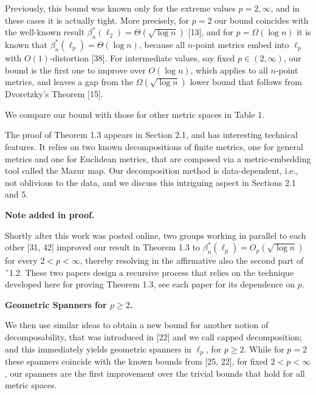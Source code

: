 \documentclass[10pt,a4paper]{amsart}
\begin{document}
\par
\par
Previously, this bound was known only for the extreme values $p=2,\infty$, and in these cases it is actually tight. More precisely, for $p=2$ our bound coincides with the well-known result $\beta^{*}_{n}(\ell_{2})=\Theta(\sqrt{\log{n}})$ [13], and for $p=\Omega(\log{n})$ it is known that $\beta^{*}_{n}(\ell_{p})=\Theta(\log{n})$, because all $n$-point metrics embed into $\ell_{p}$ with $O(1)$-distortion [38]. For intermediate values, say fixed $p\in(2,\infty)$, our bound is the first one to improve over $O(\log n)$, which applies to all $n$-point metrics, and leaves a gap from the $\Omega(\sqrt{\log{n}})$ lower bound that follows from Dvoretzky’s Theorem [15].
\par
\par
We compare our bound with those for other metric spaces in Table 1.
\par
\par
The proof of Theorem 1.3 appears in Section 2.1, and has interesting technical features. It relies on two known decompositions of finite metrics, one for general metrics and one for Euclidean metrics, that are composed via a metric-embedding tool called the Mazur map. Our decomposition method is data-dependent, i.e., not oblivious to the data, and we discuss this intriguing aspect in Sections 2.1 and 5.
\par
\par
\par\medskip\noindent\textbf{Note added in proof.}\par
Shortly after this work was posted online, two groups working in parallel to each other [31, 42] improved our result in Theorem 1.3 to $\beta^{*}_{n}(\ell_{p})=O_{p}(\sqrt{\log{n}})$ for every $2<p<\infty$, thereby resolving in the affirmative also the second part of ˜1.2. These two papers design a recursive process that relies on the technique developed here for proving Theorem 1.3, see each paper for its dependence on $p$.
\par
\par
\par
\par\medskip\noindent\textbf{Geometric Spanners for $p\geq 2$.}\par
We then use similar ideas to obtain a new bound for another notion of decomposability, that was introduced in [22] and we call capped decomposition; and this immediately yields geometric spanners in $\ell_{p}$, for $p\geq 2$. While for $p=2$ these spanners coincide with the known bounds from [25, 22], for fixed $2<p<\infty$, our spanners are the first improvement over the trivial bounds that hold for all metric spaces.
\end{document}
